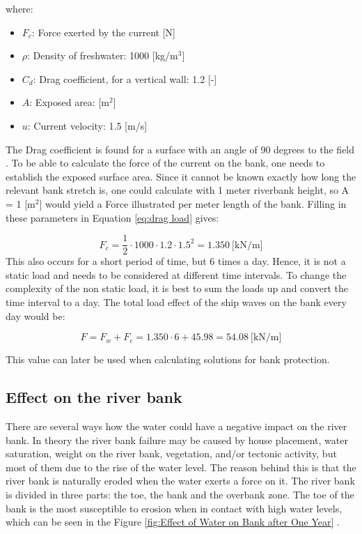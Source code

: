 \noindent where:
\begin{itemize}
    \item \textbf{$ F_c $}: Force exerted by the current [N]
    \item \textbf{$ \rho $}: Density of freshwater: 1000 [kg/m$^3$]
    \item \textbf{$ C_d $}: Drag coefficient, for a vertical wall: 1.2 [-]
    \item \textbf{$ A $}: Exposed area:  [m$^2$]
    \item \textbf{$ u $}: Current velocity: 1.5 [m/s]
\end{itemize}

The Drag coefficient is found for a surface with an angle of 90 degrees to the field \autocite{chhabrarajendraprasadDragCoefficientOverview}.
To be able to calculate the force of the current on the bank, one needs to establish the exposed surface area. Since it cannot be known exactly how long the relevant bank stretch is, one could calculate with 1 meter riverbank height, so A = 1 [m$^2$] would yield a Force illustrated per meter length of the bank. Filling in these parameters in Equation \ref{eq:drag load} gives:

$$
F_c = \frac{1}{2} \cdot 1000 \cdot 1.2 \cdot 1.5^2 = 1.350 ~\text{[kN/m]}
$$
This also occurs for a short period of time, but 6 times a day. Hence, it is not a static load and needs to be considered at different time intervals. To change the complexity of the non static load, it is best to sum the loads up and convert the time interval to a day.
The total load effect of the ship waves on the bank every day would be:

$$
F = F_w + F_c = 1.350 \cdot 6 + 45.98 = 54.08 ~\text{[kN/m]}
$$

This value can later be used when calculating solutions for bank protection. 

\subsection{Effect on the river bank}
\label{chap 6: effect on the river bed}
There are several ways how the water could have a negative impact on the river bank. In theory the river bank failure may be caused by house placement, water saturation, weight on the river bank, vegetation, and/or tectonic activity, but most of them due to the rise of the water level. The reason behind this is that the river bank is naturally eroded when the water exerts a force on it.
The river bank is divided in three parts: the toe, the bank and the overbank zone. The toe of the bank is the most susceptible to erosion when in contact with high water levels, which can be seen in the Figure \ref{fig:Effect of Water on Bank after One Year} \autocite{governmentofsouthaustraliaRiverbankCollapse2024}.

